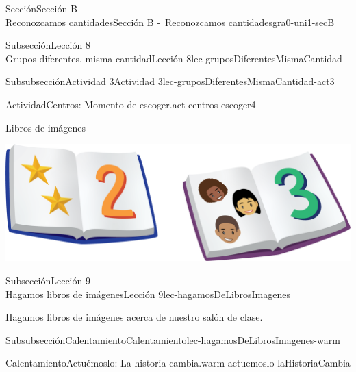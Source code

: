 \begin{sectionptx}{Sección}{{\Large Sección B\\}Reconozcamos cantidades}{}{Sección B -~Reconozcamos cantidades}{}{}{gra0-uni1-secB}
\begin{subsectionptx}{Subsección}{{\normalsize Lección 8\\[-0.05cm]}Grupos diferentes, misma cantidad}{}{Lección 8}{}{}{lec-gruposDiferentesMismaCantidad}
\begin{subsubsectionptx}{Subsubsección}{Actividad 3}{}{Actividad 3}{}{}{lec-gruposDiferentesMismaCantidad-act3}
\begin{activity}{Actividad}{Centros: Momento de escoger.}{act-centros-escoger4}
\begin{sidebyside}{2}{0.025}{0.025}{0.05}
\begin{sbspanel}{0.45}%
Libros de imágenes%
\par
\includegraphics[max width=\linewidth, center]{external/png-source/K.1.D Beta Student Workbooks.Books.png}
\end{sbspanel}%
\end{sidebyside}%
\end{activity}%
\end{subsubsectionptx}
\end{subsectionptx}
%
%
\typeout{************************************************}
\typeout{************************************************}
%
\begin{subsectionptx}{Subsección}{{\normalsize Lección 9\\[-0.05cm]}Hagamos libros de imágenes}{}{Lección 9}{}{}{lec-hagamosDeLibrosImagenes}
\begin{introduction}{}%
Hagamos libros de imágenes acerca de nuestro salón de clase.%
\end{introduction}%
%
%
\typeout{************************************************}
\typeout{************************************************}
%
\begin{subsubsectionptx}{Subsubsección}{Calentamiento}{}{Calentamiento}{}{}{lec-hagamosDeLibrosImagenes-warm}
\begin{exploration}{Calentamiento}{Actuémoslo: La historia cambia.}{warm-actuemoslo-laHistoriaCambia}%
\begin{image}{0.0}{1}{0.0}{}%

\end{image}
\end{exploration}
\end{subsubsectionptx}
\end{subsectionptx}
\end{sectionptx}
